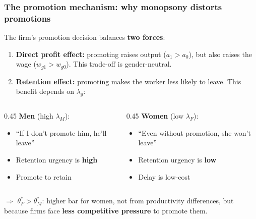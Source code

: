 \documentclass[aspectratio=169, 11pt]{beamer}
\begin{document}
\begin{frame}[label=retentionslide]
\frametitle{The promotion mechanism: why monopsony distorts promotions}

The firm's promotion decision balances \textbf{two forces}:

\vspace{0.1cm}
\begin{enumerate}
    \item \textbf{Direct profit effect:} promoting raises output ($a_1 > a_0$), but also raises the wage ($w_{g1} > w_{g0}$). This trade-off is gender-neutral.
    \bigskip
    \item \textbf{Retention effect:} promoting makes the worker less likely to leave. This benefit depends on $\lambda_g$:
\end{enumerate}

\vspace{0.1cm}
\begin{columns}[T]
    \begin{column}{0.45\textwidth}
        \textbf{Men} (high $\lambda_M$):
        \begin{itemize}
            \item ``If I don't promote him, he'll leave''
            \item Retention urgency is \textbf{high}
            \item[$\Rightarrow$] Promote to retain
        \end{itemize}
    \end{column}
    \begin{column}{0.45\textwidth}
        \textbf{Women} (low $\lambda_F$):
        \begin{itemize}
            \item ``Even without promotion, she won't leave''
            \item Retention urgency is \textbf{low}
            \item[$\Rightarrow$] Delay is low-cost
        \end{itemize}
    \end{column}
\end{columns}

\vspace{0.3cm}
$\Rightarrow$ $\theta_F^* > \theta_M^*$: higher bar for women, not from productivity differences, but because firms face \textbf{less competitive pressure} to promote them.
\hfill\hyperlink{foc-formal}{}

\end{frame}
\end{document}
